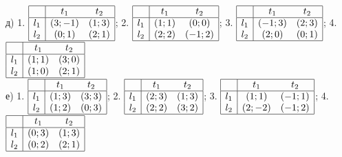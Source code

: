 \begin{problem}
\begin{enumerate}
д)	1.  $\begin{array}{|c|cc|}  \hline {} & {t_{1} } & {t_{2} } \\  \hline {l_{1} } & {\left(3;-1\right)} & {\left(1;3\right)} \\ {l_{2} } & {\left(0;1\right)} & {\left(2;1\right)} \\  \hline  \end{array}$; 2.  $\begin{array}{|c|cc|}  \hline {} & {t_{1} } & {t_{2} } \\  \hline {l_{1} } & {\left(1;1\right)} & {\left(0;0\right)} \\ {l_{2} } & {\left(2;2\right)} & {\left(-1;2\right)} \\  \hline  \end{array}$; 3.  $\begin{array}{|c|cc|}  \hline {} & {t_{1} } & {t_{2} } \\  \hline {l_{1} } & {\left(-1;3\right)} & {\left(2;3\right)} \\ {l_{2} } & {\left(2;0\right)} & {\left(0;1\right)} \\  \hline  \end{array}$; 4.  $\begin{array}{|c|cc|}  \hline {} & {t_{1} } & {t_{2} } \\  \hline {l_{1} } & {\left(1;1\right)} & {\left(3;0\right)} \\ {l_{2} } & {\left(1;0\right)} & {\left(2;1\right)} \\  \hline  \end{array}$ \\
е)	1.  $\begin{array}{|c|cc|}  \hline {} & {t_{1} } & {t_{2} } \\  \hline {l_{1} } & {\left(1;3\right)} & {\left(3;3\right)} \\ {l_{2} } & {\left(1;2\right)} & {\left(0;3\right)} \\  \hline  \end{array}$; 2.  $\begin{array}{|c|cc|}  \hline {} & {t_{1} } & {t_{2} } \\  \hline {l_{1} } & {\left(2;3\right)} & {\left(1;3\right)} \\ {l_{2} } & {\left(2;2\right)} & {\left(3;2\right)} \\  \hline  \end{array}$; 3.  $\begin{array}{|c|cc|}  \hline {} & {t_{1} } & {t_{2} } \\  \hline {l_{1} } & {\left(1;1\right)} & {\left(-1;1\right)} \\ {l_{2} } & {\left(2;-2\right)} & {\left(-1;2\right)} \\  \hline  \end{array}$; 4.  $\begin{array}{|c|cc|}  \hline {} & {t_{1} } & {t_{2} } \\  \hline {l_{1} } & {\left(0;3\right)} & {\left(1;3\right)} \\ {l_{2} } & {\left(0;2\right)} & {\left(2;1\right)} \\  \hline  \end{array}$

\end{enumerate}
\end{problem}
